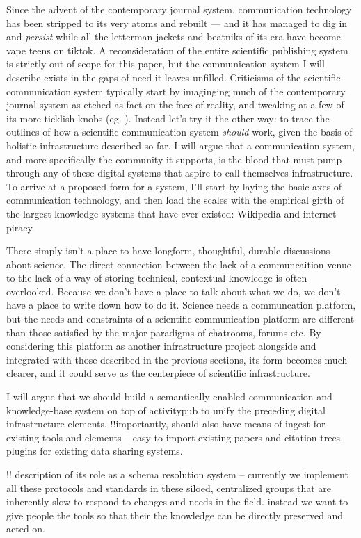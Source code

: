\documentclass[10pt]{article}
\begin{document}
\begin{multicols}{2}
Since the advent of the contemporary journal system, communication
technology has been stripped to its very atoms and rebuilt --- and it
has managed to dig in and \emph{persist} while all the letterman jackets
and beatniks of its era have become vape teens on tiktok. A
reconsideration of the entire scientific publishing system is strictly
out of scope for this paper, but the communication system I will
describe exists in the gaps of need it leaves unfilled. Criticisms of
the scientific communication system typically start by imaginging much
of the contemporary journal system as etched as fact on the face of
reality, and tweaking at a few of its more ticklish knobs (eg. \cite{heesenPeerReviewGood2020} ). Instead let's try it the other way: to
trace the outlines of how a scientific communication system
\emph{should} work, given the basis of holistic infrastructure described
so far. I will argue that a communication system, and more specifically
the community it supports, is the blood that must pump through any of
these digital systems that aspire to call themselves infrastructure. To
arrive at a proposed form for a system, I'll start by laying the basic
axes of communication technology, and then load the scales with the
empirical girth of the largest knowledge systems that have ever existed:
Wikipedia and internet piracy.

There simply isn't a place to have longform, thoughtful, durable
discussions about science. The direct connection between the lack of a
communcaition venue to the lack of a way of storing technical,
contextual knowledge is often overlooked. Because we don't have a place
to talk about what we do, we don't have a place to write down how to do
it. Science needs a communcation platform, but the needs and constraints
of a scientific communication platform are different than those
satisfied by the major paradigms of chatrooms, forums etc. By
considering this platform as another infrastructure project alongside
and integrated with those described in the previous sections, its form
becomes much clearer, and it could serve as the centerpiece of
scientific infrastructure.

I will argue that we should build a semantically-enabled communication
and knowledge-base system on top of activitypub to unify the preceding
digital infrastructure elements. !!importantly, should also have means
of ingest for existing tools and elements -- easy to import existing
papers and citation trees, plugins for existing data sharing systems.

!! description of its role as a schema resolution system -- currently we
implement all these protocols and standards in these siloed, centralized
groups that are inherently slow to respond to changes and needs in the
field. instead we want to give people the tools so that their the
knowledge can be directly preserved and acted on.


\end{multicols}
\end{document}
